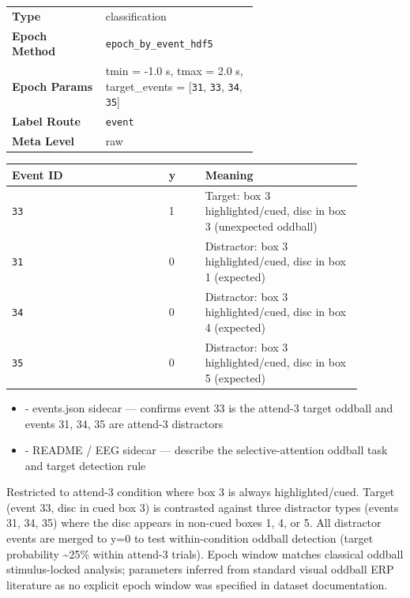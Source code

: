{\begin{tcolorbox}
{\footnotesize\begin{tabular}{@{}lp{0.62\linewidth}@{}}
\textbf{Type} & classification \\
\textbf{Epoch Method} & \texttt{epoch\_by\_event\_hdf5} \\
\textbf{Epoch Params} & tmin = -1.0 s, tmax = 2.0 s, target\_events = [\texttt{31}, \texttt{33}, \texttt{34}, \texttt{35}] \\
\textbf{Label Route} & \texttt{event} \\
\textbf{Meta Level} & raw \\
\end{tabular}}
\par{}\par\smallskip
\begingroup\footnotesize
\begin{tabular}{@{}p{0.3911\linewidth}p{0.0978\linewidth}p{0.3911\linewidth}@{}}
\toprule
\textbf{Event ID} & \textbf{y} & \textbf{Meaning} \\
\midrule
\texttt{33} & 1 & Target: box 3 highlighted/cued, disc in box 3 (unexpected oddball) \\
\texttt{31} & 0 & Distractor: box 3 highlighted/cued, disc in box 1 (expected) \\
\texttt{34} & 0 & Distractor: box 3 highlighted/cued, disc in box 4 (expected) \\
\texttt{35} & 0 & Distractor: box 3 highlighted/cued, disc in box 5 (expected) \\
\bottomrule
\end{tabular}
\endgroup
\par{}\par
\begin{itemize}[leftmargin=1.3em,noitemsep,topsep=1pt]
\item[\scriptsize$\cdot$] {\scriptsize - events.json sidecar --- confirms event 33 is the attend-3 target oddball and events 31, 34, 35 are attend-3 distractors}
\item[\scriptsize$\cdot$] {\scriptsize - README / EEG sidecar --- describe the selective-attention oddball task and target detection rule}
\end{itemize}
\par{} {\footnotesize Restricted to attend-3 condition where box 3 is always highlighted/cued. Target (event 33, disc in cued box 3) is contrasted against three distractor types (events 31, 34, 35) where the disc appears in non-cued boxes 1, 4, or 5. All distractor events are merged to y=0 to test within-condition oddball detection (target probability \textasciitilde{}25\% within attend-3 trials). Epoch window matches classical oddball stimulus-locked analysis; parameters inferred from standard visual oddball ERP literature as no explicit epoch window was specified in dataset documentation.}

\end{tcolorbox}}
